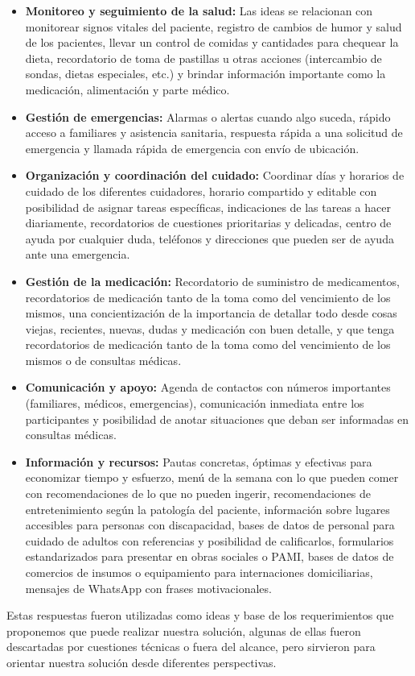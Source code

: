 \documentclass[a4paper,12pt]{article}
\begin{document}
    \begin{itemize}
        \item \textbf{Monitoreo y seguimiento de la salud:} Las ideas se relacionan con monitorear signos vitales del paciente, registro de cambios de humor y salud de los pacientes, llevar un control de comidas y cantidades para chequear la dieta, recordatorio de toma de pastillas u otras acciones (intercambio de sondas, dietas especiales, etc.) y brindar información importante como la medicación, alimentación y parte médico.
        \item \textbf{Gestión de emergencias:} Alarmas o alertas cuando algo suceda, rápido acceso a familiares y asistencia sanitaria, respuesta rápida a una solicitud de emergencia y llamada rápida de emergencia con envío de ubicación.
        \item \textbf{Organización y coordinación del cuidado:} Coordinar días y horarios de cuidado de los diferentes cuidadores, horario compartido y editable con posibilidad de asignar tareas específicas, indicaciones de las tareas a hacer diariamente, recordatorios de cuestiones prioritarias y delicadas, centro de ayuda por cualquier duda, teléfonos y direcciones que pueden ser de ayuda ante una emergencia.
        \item \textbf{Gestión de la medicación:} Recordatorio de suministro de medicamentos, recordatorios de medicación tanto de la toma como del vencimiento de los mismos, una concientización de la importancia de detallar todo desde cosas viejas, recientes, nuevas, dudas y medicación con buen detalle, y que tenga recordatorios de medicación tanto de la toma como del vencimiento de los mismos o de consultas médicas.
        \item \textbf{Comunicación y apoyo:} Agenda de contactos con números importantes (familiares, médicos, emergencias), comunicación inmediata entre los participantes y posibilidad de anotar situaciones que deban ser informadas en consultas médicas.
        \item \textbf{Información y recursos:} Pautas concretas, óptimas y efectivas para economizar tiempo y esfuerzo, menú de la semana con lo que pueden comer con recomendaciones de lo que no pueden ingerir, recomendaciones de entretenimiento según la patología del paciente, información sobre lugares accesibles para personas con discapacidad, bases de datos de personal para cuidado de adultos con referencias y posibilidad de calificarlos, formularios estandarizados para presentar en obras sociales o PAMI, bases de datos de comercios de insumos o equipamiento para internaciones domiciliarias, mensajes de WhatsApp con frases motivacionales.
    \end{itemize}
    Estas respuestas fueron utilizadas como ideas y base de los requerimientos que proponemos que puede realizar nuestra solución, algunas de ellas fueron descartadas por cuestiones técnicas o fuera del alcance, pero sirvieron para orientar nuestra solución desde diferentes perspectivas.
\end{document}
